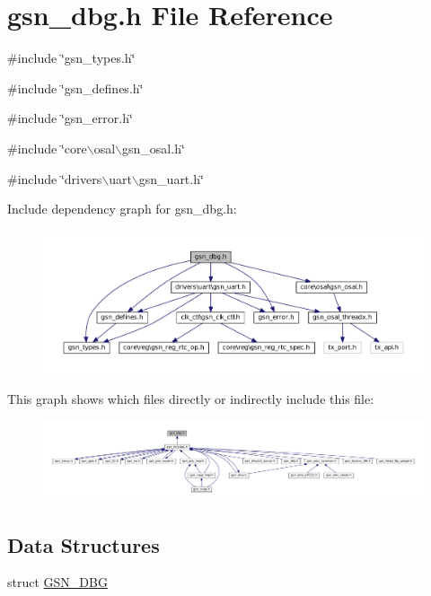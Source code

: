 \hypertarget{a00480}{
\section{gsn\_\-dbg.h File Reference}
\label{a00480}
}
{\ttfamily \#include \char`\"{}gsn\_\-types.h\char`\"{}}\par
{\ttfamily \#include \char`\"{}gsn\_\-defines.h\char`\"{}}\par
{\ttfamily \#include \char`\"{}gsn\_\-error.h\char`\"{}}\par
{\ttfamily \#include \char`\"{}core$\backslash$osal$\backslash$gsn\_\-osal.h\char`\"{}}\par
{\ttfamily \#include \char`\"{}drivers$\backslash$uart$\backslash$gsn\_\-uart.h\char`\"{}}\par
Include dependency graph for gsn\_\-dbg.h:
\nopagebreak
\begin{figure}[H]
\begin{center}
\leavevmode
\includegraphics[width=400pt]{a00706}
\end{center}
\end{figure}
This graph shows which files directly or indirectly include this file:
\nopagebreak
\begin{figure}[H]
\begin{center}
\leavevmode
\includegraphics[width=400pt]{a00707}
\end{center}
\end{figure}
\subsection*{Data Structures}
\begin{DoxyCompactItemize}
\item 
struct \hyperlink{a00042}{GSN\_\-DBG}
\end{DoxyCompactItemize}
